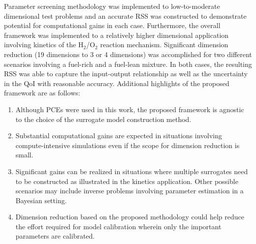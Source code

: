 Parameter screening methodology was implemented to low-to-moderate dimensional
test problems and an accurate RSS was constructed to demonstrate potential for
computational gains in each case. Furthermore, the overall framework was
implemented  to a relatively higher dimensional application involving kinetics
of the H$_2$/O$_2$ reaction mechanism.  Significant dimension reduction (19 
dimensions to 3 or 4 dimensions) was
accomplished for two different scenarios involving a fuel-rich and a fuel-lean
mixture. In both cases, the resulting RSS was able to capture the input-output
relationship as well as the uncertainty in the QoI with
reasonable accuracy. 
Additional highlights of the proposed framework are as follows:
\begin{enumerate}
\item Although PCEs were used in this work, the proposed framework is
agnostic to the choice of the surrogate model construction method.
\item Substantial computational gains are expected in situations involving
compute-intensive simulations even if the scope for dimension reduction is
small. 

\item Significant gains can be realized in situations where multiple surrogates need to be
constructed as illustrated in the kinetics application. Other possible scenarios may
include inverse problems involving parameter estimation in a Bayesian setting.

\item Dimension reduction based on the proposed methodology could help reduce the
effort required for model calibration wherein only the important parameters
are calibrated. 
\end{enumerate}

